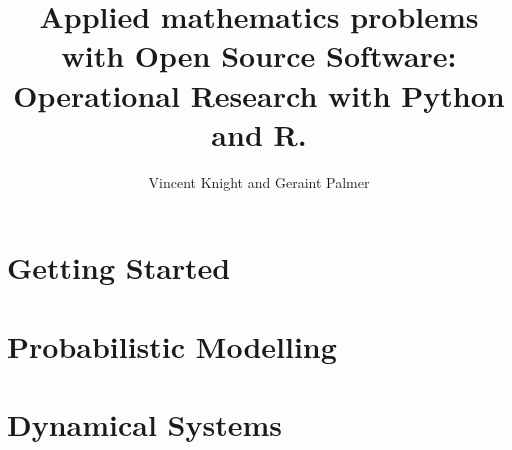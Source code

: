 \documentclass[Alon2,singlecolor,11pt]{Alon}
\title{Applied mathematics problems with Open Source Software:
       Operational Research with Python and R.}
\author{Vincent Knight and Geraint Palmer}
\begin{document}
\frontmatter



\halftitle

\booktitle

\locpage



\cleardoublepage
\setcounter{page}{7} %
\tableofcontents






\mainmatter

\part{Getting Started}




\part{Probabilistic Modelling}



\part{Dynamical Systems}





\printindex
\cleardoublepage
\end{document}
